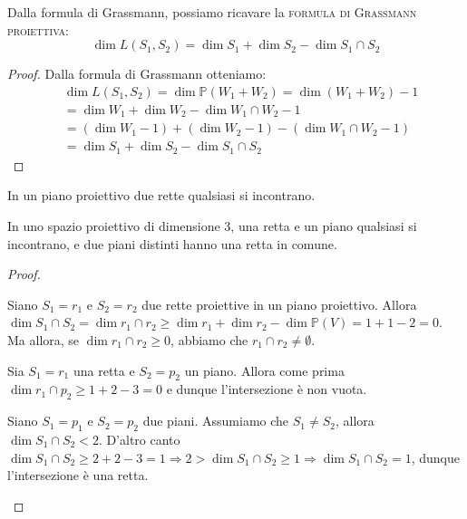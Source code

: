 \begin{defn}
Dalla formula di Grassmann, possiamo ricavare la \textsc{formula di Grassmann proiettiva}:
$$\dim L(S_1,S_2)=\dim S_1+\dim S_2-\dim S_1 \cap S_2$$
\end{defn}

\begin{proof}
Dalla formula di Grassmann otteniamo:
\begin{align*}
&\dim L(S_1,S_2)=\dim \mathbb{P}(W_1+W_2)=\dim (W_1+W_2)-1\\
&=\dim W_1+\dim W_2-\dim W_1 \cap W_2 -1\\
&=(\dim W_1 -1)+(\dim W_2 -1)-(\dim W_1 \cap W_2 -1)\\
&=\dim S_1+\dim S_2-\dim S_1 \cap S_2
\end{align*}
\end{proof}

\begin{prop}
\begin{nlist}
\item In un piano proiettivo due rette qualsiasi si incontrano.
\item In uno spazio proiettivo di dimensione 3, una retta e un piano qualsiasi si incontrano, e due piani distinti hanno una retta in comune.
\end{nlist}
\end{prop}

\begin{proof}
\begin{nlist}
\item Siano $S_1=r_1$ e $S_2=r_2$ due rette proiettive in un piano proiettivo. Allora $\dim S_1 \cap S_2=\dim r_1 \cap r_2 \ge \dim r_1+\dim r_2 -\dim \mathbb{P}(V)=1+1-2=0$. Ma allora, se $\dim r_1 \cap r_2 \ge 0$, abbiamo che $r_1 \cap r_2 \neq \emptyset$.
\item Sia $S_1=r_1$ una retta e $S_2=p_2$ un piano. Allora come prima $\dim r_1 \cap p_2 \ge 1+2-3=0$ e dunque l'intersezione è non vuota.

Siano $S_1=p_1$ e $S_2=p_2$ due piani. Assumiamo che $S_1 \neq S_2$, allora $\dim S_1 \cap S_2 <2$. D'altro canto $\dim S_1 \cap S_2 \ge 2+2-3=1 \Rightarrow 2>\dim S_1\cap S_2 \ge 1 \Rightarrow \dim S_1 \cap S_2=1$, dunque l'intersezione è una retta.
\end{nlist}
\end{proof}

